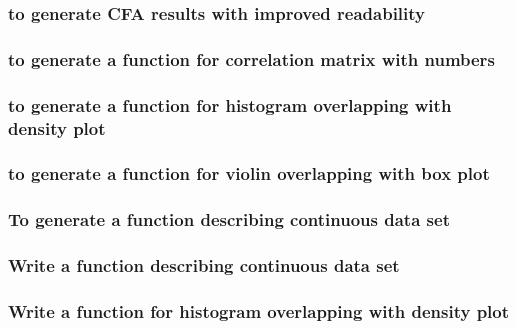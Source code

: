 \documentclass[
]{article}
\begin{document}
\hypertarget{to-generate-cfa-results-with-improved-readability}{%
\subsubsection{to generate CFA results with improved readability}\label{to-generate-cfa-results-with-improved-readability}}

\hypertarget{to-generate-a-function-for-correlation-matrix-with-numbers}{%
\subsubsection{to generate a function for correlation matrix with numbers}\label{to-generate-a-function-for-correlation-matrix-with-numbers}}

\hypertarget{to-generate-a-function-for-histogram-overlapping-with-density-plot}{%
\subsubsection{to generate a function for histogram overlapping with density plot}\label{to-generate-a-function-for-histogram-overlapping-with-density-plot}}

\hypertarget{to-generate-a-function-for-violin-overlapping-with-box-plot}{%
\subsubsection{to generate a function for violin overlapping with box plot}\label{to-generate-a-function-for-violin-overlapping-with-box-plot}}

\hypertarget{to-generate-a-function-describing-continuous-data-set}{%
\subsubsection{To generate a function describing continuous data set}\label{to-generate-a-function-describing-continuous-data-set}}

\hypertarget{write-a-function-describing-continuous-data-set}{%
\subsubsection{Write a function describing continuous data set}\label{write-a-function-describing-continuous-data-set}}

\hypertarget{write-a-function-for-histogram-overlapping-with-density-plot}{%
\subsubsection{Write a function for histogram overlapping with density plot}\label{write-a-function-for-histogram-overlapping-with-density-plot}}
\end{document}
